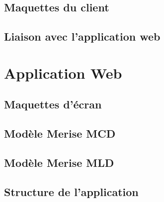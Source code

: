 \documentclass[a4paper]{article}
\begin{document}
	\subsection{Maquettes du client}
		
	\subsection{Liaison avec l'application web}
		
		
\newpage

\section{Application Web}

	\subsection{Maquettes d'écran}
		
\newpage

	\subsection{Modèle Merise MCD}
		
\newpage

	\subsection{Modèle Merise MLD}
		
\newpage

	\subsection{Structure de l'application}
		

\newpage
\tableofcontents
\end{document}
